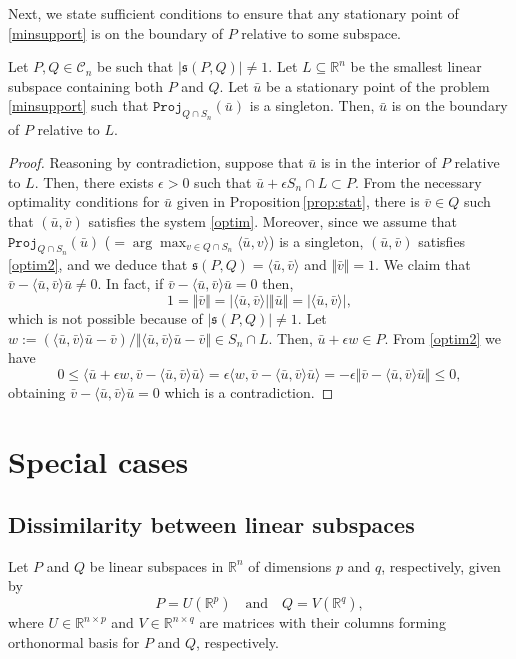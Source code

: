 \documentclass[hidelinks,onefignum,onetabnum]{siamart250211}
\theoremstyle{definition}
\theoremstyle{remark}
\newcommand{\R}{\mathbb R}
\newcommand{\bv}{\bar{v}}
\newcommand{\bu}{\bar{u}}
\newcommand{\RR}{\mathbb R}
\newcommand{\inner}[2]{\langle#1,#2\rangle}
\newcommand{\proj}{\mathtt{Proj}}
\begin{document}
Next, we state sufficient conditions to ensure that any stationary point of \eqref{minsupport} is on the boundary of $P$ relative to some subspace.
\begin{proposition}\label{boundary}
Let $P,Q\in\mathcal C_n$ be such that $|\mathfrak{s}(P,Q)|\neq 1$. Let $L\subseteq\R^n$ be the smallest linear subspace containing both $P$ and $Q$. Let $\bu$ be a stationary point of the problem \eqref{minsupport} such that $\proj_{Q\cap S_n}(\bu)$ is a singleton. Then, $\bu$ is on the boundary of $P$ relative to $L$.
\end{proposition}
\begin{proof}
Reasoning by contradiction, suppose that $\bu$ is in the interior of $P$ relative to $L$. Then, there exists $\epsilon>0$ such that $\bu+\epsilon S_n\cap L\subset P$. From the necessary optimality conditions for $\bu$ given in Proposition\,\ref{prop:stat}, there is $\bv\in Q$ such that $(\bu,\bv)$ satisfies the system \eqref{optim}. Moreover, since we assume that $\proj_{Q\cap S_n}(\bu)$ ($=\arg\max_{v \in Q\cap S_n} \inner{\bar u}{v}$) is a singleton, $(\bu,\bv)$ satisfies \eqref{optim2}, and we deduce that $\mathfrak{s}(P,Q)=\langle\bu,\bv\rangle$ and $\Vert \bv\Vert=1$. We claim that $\bv-\langle \bu,\bv\rangle \bu\neq 0$. In fact, if $\bv-\langle \bu,\bv\rangle \bu= 0$ then,
\[1=\Vert \bv\Vert=|\langle \bu,\bv\rangle|\Vert \bu\Vert=|\langle \bu,\bv\rangle|,\] 
which is not possible because of  $|\mathfrak{s}(P,Q)|\neq 1$.   Let $w:=(\langle \bu,\bv\rangle \bu-\bv)/\Vert \langle \bu,\bv\rangle \bu-\bv\Vert\in S_n\cap L$. Then, $\bu+\epsilon w\in P.$ From \eqref{optim2} we have
\[0\leq\langle \bu+\epsilon w,\bv-\langle \bu,\bv\rangle \bu\rangle=\epsilon\langle w,\bv-\langle \bu,\bv\rangle \bu\rangle=-\epsilon\Vert \bv-\langle \bu,\bv\rangle \bu\Vert\leq0,\]
obtaining $\bv-\langle \bu,\bv\rangle \bu=0$ which is a contradiction.
\end{proof}





\section{Special cases}\label{sec:cases}

\subsection{Dissimilarity between linear subspaces}
Let $P$ and $Q$ be linear subspaces in $\RR^n$ of dimensions $p$ and $q$, respectively, given by
\begin{equation}\label{subspaces}
P=U(\RR^p)\quad\text{and}\quad Q=V(\R^q),
\end{equation}
where $U\in\R^{n\times p}$ and $V\in\R^{n\times q}$ are matrices with their columns forming orthonormal basis for $P$ and $Q$, respectively.
\end{document}
